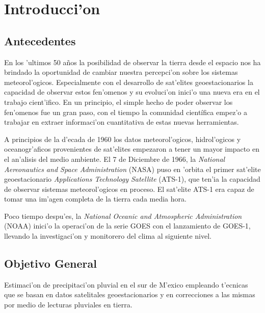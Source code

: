 \chapter{Introducci'on}
\section{Antecedentes}

En los 'ultimos 50 a\~nos la posibilidad de observar la tierra desde el espacio
nos ha brindado la oportunidad de cambiar nuestra percepci'on sobre los sistemas 
meteorol'ogicos. Especialmente con el desarrollo de sat'elites geoestacionarios 
la capacidad de observar estos fen'omenos y su evoluci'on inici'o una nueva era en 
el trabajo cient'ifico. En un principio, el simple hecho de poder observar los fen'omenos
fue un gran paso, con el tiempo la comunidad científica empez'o a trabajar en extraer informaci'on
cuantitativa de estas nuevas herramientas.

A principios de la d'ecada de 1960 los datos meteorol'ogicos, hidrol'ogicos y oceanogr'aficos
provenientes de sat'elites empezaron a tener un mayor impacto en el an'alisis del medio 
ambiente. El 7 de Diciembre de 1966, la \textit{National Aereonautics and Space Administration} (NASA)
puso en 'orbita el primer sat'elite geoestacionario \textit{Applications Technology Satellite} (ATS-1),
que ten'ia la capacidad de observar sistemas meteorol'ogicos en proceso. El sat'elite ATS-1 era
capaz de tomar una im'agen completa de la tierra cada media hora.

Poco tiempo despu'es, la \textit{National Oceanic and Atmospheric Administration} (NOAA) inici'o la
operaci'on de la serie GOES con el lanzamiento de GOES-1, llevando la
investigaci'on y monitorero del clima al siguiente nivel. 


\section{Objetivo General}
Estimaci'on de precipitaci'on pluvial en el sur de M'exico empleando
t'ecnicas que se basan en datos satelitales geoestacionarios y en
correcciones a las mismas por medio de lecturas pluviales en tierra.

